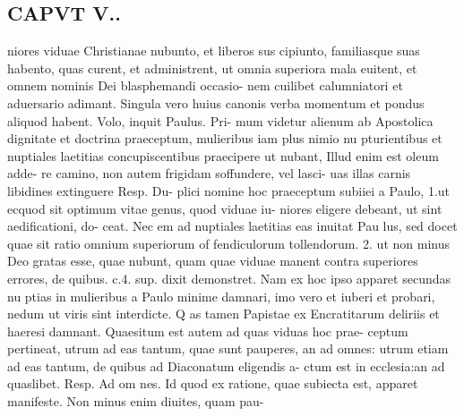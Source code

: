\documentclass{article}
\begin{document}
\begin{pages}
\section*{CAPVT  V.. }
\marginpar{[ p.29 ]}niores viduae Christianae nubunto, et liberos sus cipiunto, familiasque suas habento, quas curent, et administrent, ut omnia superiora mala euitent, et omnem nominis Dei blasphemandi occasio- nem cuilibet calumniatori et aduersario adimant. Singula vero huius canonis verba momentum et pondus aliquod habent. Volo, inquit Paulus. Pri- mum videtur alienum ab Apostolica dignitate et doctrina praeceptum, mulieribus iam plus nimio nu pturientibus et nuptiales laetitias concupiscentibus praecipere ut nubant, Illud enim est oleum adde- re camino, non autem frigidam soffundere, vel lasci- uas illas carnis libidines extinguere Resp. Du- plici nomine hoc praeceptum subiiei a Paulo, 1.ut ecquod sit optimum vitae genus, quod viduae iu- niores eligere debeant, ut sint aedificationi, do- ceat. Nec em ad nuptiales laetitias eas inuitat Pau lus, sed docet quae sit ratio omnium superiorum of fendiculorum tollendorum. 2. ut non minus Deo gratas esse, quae nubunt, quam quae viduae manent contra superiores errores, de quibus. c.4. sup. dixit demonstret. Nam ex hoc ipso apparet secundas nu ptias in mulieribus a Paulo minime damnari, imo vero et iuberi et probari, nedum ut viris sint interdicte. Q as tamen Papistae ex Encratitarum deliriis et haeresi damnant. Quaesitum est autem ad quas viduas hoc prae- ceptum pertineat, utrum ad eas tantum, quae sunt pauperes, an ad omnes: utrum etiam ad eas tantum, de quibus ad Diaconatum eligendis a- ctum est in ecclesia:an ad quaslibet. Resp. Ad om nes. Id quod ex ratione, quae subiecta est, apparet manifeste. Non minus enim diuites, quam pau- 

\end{pages}
\end{document}
